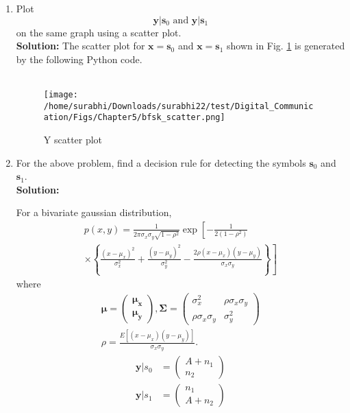 \documentclass[journal,10pt,twocolumn]{IEEEtran}
\newcounter{Chapcounter}
\numberwithin{equation}{subsection}
\numberwithin{figure}{subsection}
\renewcommand\thesection{\theChapcounter.\arabic{section}}
\providecommand{\mbf}{\mathbf}
\providecommand{\sbrak}[1]{\ensuremath{{}\left[#1\right]}}
\providecommand{\lsbrak}[1]{\ensuremath{{}\left[#1\right.}}
\providecommand{\rsbrak}[1]{\ensuremath{{}\left.#1\right]}}
\providecommand{\brak}[1]{\ensuremath{\left(#1\right)}}
\providecommand{\cbrak}[1]{\ensuremath{\left\{#1\right\}}}
\newcommand{\solution}{\noindent \textbf{Solution: }}
\renewcommand\thesection{\arabic{section}}
\renewcommand\thesubsection{\thesection.\arabic{subsection}}
\begin{document}
\begin{enumerate}[label=\thesubsection.\arabic*,ref=\thesubsection.\arabic{figure}]
\item
\label{ch5_fsk}
Plot 
%
\begin{equation}
\mbf{y}|\mbf{s}_0 \text{ and } \mbf{y}|\mbf{s}_1
\end{equation}
%
on the same graph using a scatter plot.\\
\solution The scatter plot for $\mbf{x} = \mbf{s}_0$ and $\mbf{x} = \mbf{s}_1$ shown in Fig. \ref{fig:scatter_2} is generated by the following Python code.\\

\\	

\begin{figure}[!ht]
\centering
\texttt{[image: /home/surabhi/Downloads/surabhi22/test/Digital\_Communication/Figs/Chapter5/bfsk\_scatter.png]}     
\caption{Y scatter plot }
\label{fig:scatter_2}
\end{figure}
\item
For the above problem, find a decision rule for detecting the symbols $\mbf{s}_0 $ and $\mbf{s}_1$.\\
\solution 

    For a bivariate gaussian distribution,
    {\small
    \begin{multline}
    \label{eq:bivariate}
    p(x,y)= \frac{1}{2\pi \sigma_x\sigma_y\sqrt{1-\rho^2}}\exp\lsbrak{-\frac{1}{2\brak{1-\rho^2}}}
    \\
    \times \rsbrak{\cbrak{\frac{\brak{x-\mu_x}^2}{\sigma_x^2}+\frac{\brak{y-\mu_y}^2}{\sigma_y^2}-\frac{2\rho\brak{x-\mu_x}\brak{y-\mu_y}}{\sigma_x\sigma_y}}}
    \end{multline}
    }
    where
    \begin{align}
\mbf{\mu}=\begin{pmatrix}
\mbf{\mu_x} \\
\mbf{\mu_y}
\end{pmatrix} , \mbf{\Sigma} = \begin{pmatrix}
\sigma_x^2 & \rho\sigma_x\sigma_y \\
    \rho\sigma_x\sigma_y & \sigma_y^2
\end{pmatrix} \\
\rho = \frac{E\sbrak{\brak{x - \mu_x}\brak{y-\mu_y}}}{\sigma_x\sigma_y}.
    \end{align}
        \begin{align}
        \mbf{y}|s_0 &= 
        \begin{pmatrix}
        A+n_1 \\
        n_2
        \end{pmatrix}\\
        \mbf{y}|s_1 &=  
        \begin{pmatrix}
        n_1 \\
        A+n_2
        \end{pmatrix}
        \end{align}


\end{enumerate}
\end{document}
